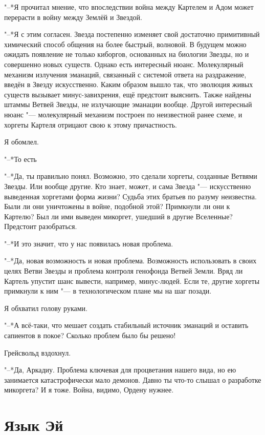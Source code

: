\documentclass[a4paper,10pt]{book}
\newcommand{\ldotsq}{\so{?\hbox{\hspace{-.212em}}..}\xspace}
\begin{document}
"--*Я прочитал мнение, что впоследствии война между Картелем и Адом может 
перерасти в войну между Землёй и Звездой.

"--*Я с этим согласен. Звезда постепенно изменяет свой достаточно примитивный 
химический способ общения на более быстрый, волновой. В будущем можно ожидать
появление не только киборгов, основанных на биологии Звезды, но и совершенно 
новых существ. Однако есть интересный нюанс. 
Молекулярный механизм излучения эманаций, 
связанный с системой ответа на раздражение, введён в Звезду искусственно. 
Каким образом вышло так, что эволюция живых существ вызывает минус-завихрения, 
ещё предстоит выяснить. Также найдены штаммы Ветвей Звезды, не излучающие 
эманации вообще. Другой интересный нюанс "--- молекулярный механизм построен по 
неизвестной ранее схеме, и хоргеты Картеля отрицают свою к этому причастность.

Я обомлел.

"--*То есть\ldotsq

"--*Да, ты правильно понял. Возможно, это сделали хоргеты, созданные Ветвями 
Звезды. Или вообще другие. Кто знает, может, и сама Звезда "--- искусственно 
выведенная хоргетами форма жизни? Судьба этих братьев по разуму неизвестна. 
Были ли они уничтожены в войне, подобной этой? Примкнули ли они к Картелю? Был 
ли ими выведен микоргет, ушедший в другие Вселенные? Предстоит разобраться.

"--*И это значит, что у нас появилась новая проблема.

"--*Да, новая возможность и новая проблема. Возможность использовать в своих 
целях Ветви Звезды и проблема контроля генофонда Ветвей Земли. Вряд ли Картель 
упустит шанс вывести, например, минус-людей. Если те, другие хоргеты примкнули 
к ним "--- в технологическом плане мы на шаг позади.

Я обхватил голову руками.

"--*А всё-таки, что мешает создать стабильный источник эманаций и оставить 
сапиентов в покое? Сколько проблем было бы решено!

Грейсвольд вздохнул.

"--*Да, Аркадиу. Проблема ключевая для процветания нашего вида, но ею 
занимается катастрофически мало демонов. Давно ты что-то слышал о разработке 
микоргета? И я тоже. Война, видимо, Ордену нужнее.


\section{Язык Эй}
\end{document}
